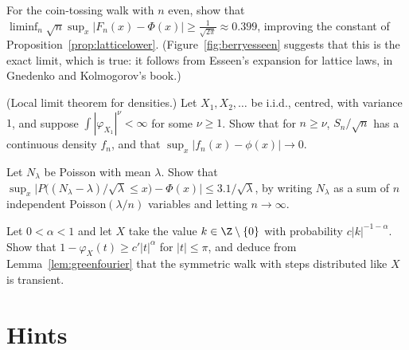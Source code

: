 \begin{exercise}[$\star\star$]\label{ex:binomialsharp}
For the coin-tossing walk with $n$ even, show that $\liminf_n\sqrt n\sup_x|F_n(x)-\Phi(x)|\ge\frac1{\sqrt{2\pi}}\approx0.399$, improving the
constant of Proposition~\ref{prop:latticelower}. (Figure~\ref{fig:berryesseen} suggests that this is the exact limit, which is true: it follows from Esseen's
expansion for lattice laws, in Gnedenko and Kolmogorov's book.)
\end{exercise}

\begin{exercise}[$\star\star$]\label{ex:lltdensity}
(Local limit theorem for densities.) Let $X_1,X_2,\dots$ be i.i.d., centred, with variance $1$, and suppose $\int|\varphi_{X_1}|^\nu<\infty$ for some
$\nu\ge1$. Show that for $n\ge\nu$, $S_n/\sqrt n$ has a continuous density $f_n$, and that $\sup_x|f_n(x)-\phi(x)|\to0$.
\end{exercise}

\begin{exercise}[$\star\star$]\label{ex:poissonbe}
Let $N_\lambda$ be Poisson with mean $\lambda$. Show that $\sup_x\bigl|P\bigl((N_\lambda-\lambda)/\sqrt\lambda\le x\bigr)-\Phi(x)\bigr|\le3.1/\sqrt\lambda$, by
writing $N_\lambda$ as a sum of $n$ independent Poisson$(\lambda/n)$ variables and letting $n\to\infty$.
\end{exercise}

\begin{exercise}[$\star\star\star$]\label{ex:heavytail}
Let $0<\alpha<1$ and let $X$ take the value $k\in\Z\setminus\{0\}$ with probability $c|k|^{-1-\alpha}$. Show that $1-\varphi_X(t)\ge c'|t|^\alpha$ for
$|t|\le\pi$, and deduce from Lemma~\ref{lem:greenfourier} that the symmetric walk with steps distributed like $X$ is transient.
\end{exercise}

\section{Hints}


